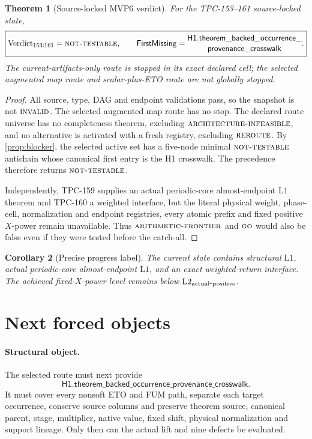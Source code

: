 \documentclass[11pt]{article}
\newtheorem{theorem}{Theorem}[section]
\newtheorem{corollary}[theorem]{Corollary}
\theoremstyle{definition}
\theoremstyle{remark}
\newcommand{\Lone}{\mathrm{L1}}
\newcommand{\Ltwo}{\mathrm{L2}}
\newcommand{\GO}{\textnormal{\textsc{go}}}
\newcommand{\AINF}{\textnormal{\textsc{architecture-infeasible}}}
\newcommand{\REROUTE}{\textnormal{\textsc{reroute}}}
\newcommand{\NT}{\textnormal{\textsc{not-testable}}}
\newcommand{\AF}{\textnormal{\textsc{arithmetic-frontier}}}
\newcommand{\INVALID}{\textnormal{\textsc{invalid}}}
\begin{document}
\begin{theorem}[Source-locked MVP6 verdict]
\label{thm:mvp6}
For the TPC-153--161 source-locked state,
\[
 \boxed{
 \operatorname{Verdict}_{153:161}=\NT,
 \qquad
 \mathsf{FirstMissing}
 =
 \begin{gathered}
 \mathsf{H1.theorem\_backed\_occurrence\_}\\[-2pt]
 \mathsf{provenance\_crosswalk}
 \end{gathered}
 .
 }
\]
The current-artifacts-only route is stopped in its exact declared
cell; the selected augmented map route and scalar-plus-ETO route are
not globally stopped.
\end{theorem}

\begin{proof}
All source, type, DAG and endpoint validations pass, so the snapshot
is not \(\INVALID\).  The selected augmented map route has no stop.
The declared route universe has no completeness theorem, excluding
\(\AINF\), and no alternative is activated with a fresh registry,
excluding \(\REROUTE\).  By \cref{prop:blocker}, the selected active
set has a five-node minimal \(\NT\) antichain whose canonical first
entry is the H1 crosswalk.  The precedence therefore returns \(\NT\).

Independently, TPC-159 supplies an actual periodic-core
almost-endpoint \(\Lone\) theorem and TPC-160 a weighted interface,
but the literal physical weight, phase-cell, normalization and endpoint
registries, every atomic prefix and fixed positive \(X\)-power remain
unavailable.  Thus \(\AF\) and \(\GO\) would also be false even if they
were tested before the catch-all.
\end{proof}

\begin{corollary}[Precise progress label]
The current state contains structural \(\Lone\), actual
periodic-core almost-endpoint \(\Lone\), and an exact weighted-return
interface.  The achieved fixed-\(X\)-power level remains below
\(\Ltwo_{\rm actual\mbox{-}positive}\).
\end{corollary}

\section{Next forced objects}

\paragraph{Structural object.}
The selected route must next provide
\[
 \mathsf{H1.theorem\_backed\_occurrence\_provenance\_crosswalk}.
\]
It must cover every nonsoft ETO and FUM path, separate each target
occurrence, conserve source columns and preserve theorem source,
canonical parent, stage, multiplier, native value, fixed shift,
physical normalization and support lineage.  Only then can the actual
lift and nine defects be evaluated.
\end{document}

